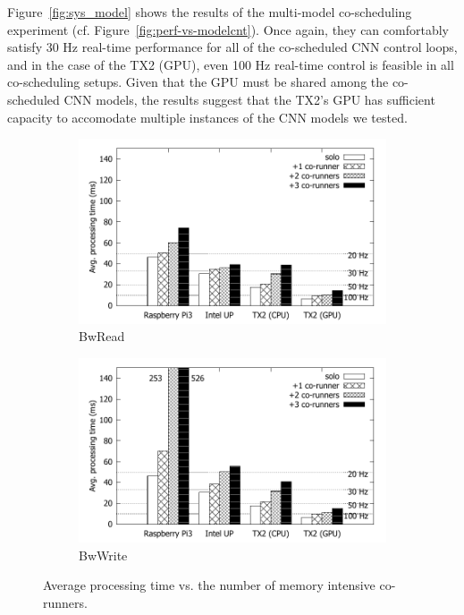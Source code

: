 Figure~\ref{fig:sys_model} shows the results of the
multi-model co-scheduling experiment
(cf. Figure~\ref{fig:perf-vs-modelcnt}). Once again, they can comfortably
satisfy 30 Hz real-time performance for all of the co-scheduled CNN control
loops, and in the case of the TX2 (GPU), even 100 Hz real-time control
is feasible in all co-scheduling setups.
Given that the GPU must be shared among the co-scheduled CNN
models, the results suggest that the TX2's GPU has sufficient capacity to
accomodate multiple instances of the CNN models we tested.

\begin{figure}[h]
  \centering
  \begin{subfigure}{0.45\textwidth}
    \includegraphics[width=\textwidth]{figs/compare_benchmark_read}
    \caption{BwRead}
    \label{fig:sys_bench_read}
  \end{subfigure}
  \hfill
  \begin{subfigure}{0.45\textwidth}
    \includegraphics[width=\textwidth]{figs/compare_benchmark}
    \caption{BwWrite}
    \label{fig:sys_bench_write}    
  \end{subfigure}
  \caption{Average processing time vs. the number of memory
    intensive co-runners.}
  \label{fig:sys_bench}    
\end{figure} 


